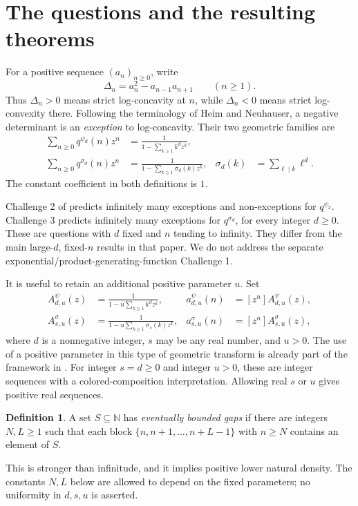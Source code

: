 \documentclass[11pt,letterpaper]{article}
\theoremstyle{definition}
\newtheorem{definition}[theorem]{Definition}
\newcommand{\N}{\mathbb N}
\newcommand{\Delt}{\Delta}
\newcommand{\sig}{\sigma}
\numberwithin{equation}{section}
\begin{document}
\clearpage
\tableofcontents
\clearpage

\section{The questions and the resulting theorems}
\label{sec:questions}

For a positive sequence $(a_n)_{n\ge0}$, write
\begin{equation}\label{eq:delta}
\Delt_n=a_n^2-a_{n-1}a_{n+1}\qquad(n\ge1).
\end{equation}
Thus $\Delt_n>0$ means strict log-concavity at $n$, while $\Delt_n<0$
means strict log-convexity there. Following the terminology of
Heim and Neuhauser, a negative determinant is an \emph{exception} to
log-concavity. Their two geometric families are
\begin{align}
\sum_{n\ge0}q^{\psi_d}(n)z^n
 &=\frac{1}{1-\sum_{k\ge1}k^d z^k},\label{eq:original-power}\\
\sum_{n\ge0}q^{\sig_d}(n)z^n
 &=\frac{1}{1-\sum_{k\ge1}\sig_d(k)z^k},
 &\sig_d(k)&=\sum_{\ell\mid k}\ell^d.\label{eq:original-divisor}
\end{align}
The constant coefficient in both definitions is $1$.

Challenge 2 of \cite{HN23} predicts infinitely many exceptions and
non-exceptions for $q^{\psi_2}$. Challenge 3 predicts infinitely many
exceptions for $q^{\sig_d}$, for every integer $d\ge0$.
These are questions with $d$ fixed and $n$ tending to infinity. They differ
from the main large-$d$, fixed-$n$ results in that paper. We do not address
the separate exponential/product-generating-function Challenge 1.

It is useful to retain an additional positive parameter $u$. Set
\begin{align}
A^\psi_{d,u}(z)&=\frac{1}{1-u\sum_{k\ge1}k^d z^k},
 &a^\psi_{d,u}(n)&=[z^n]A^\psi_{d,u}(z),\label{eq:power-family}\\
A^\sig_{s,u}(z)&=\frac{1}{1-u\sum_{k\ge1}\sig_s(k)z^k},
 &a^\sig_{s,u}(n)&=[z^n]A^\sig_{s,u}(z),\label{eq:divisor-family}
\end{align}
where $d$ is a nonnegative integer, $s$ may be any real number, and $u>0$.
The use of a positive parameter in this type of geometric transform is
already part of the framework in \cite{HN21}. For integer $s=d\ge0$ and
integer $u>0$, these are integer sequences with a colored-composition
interpretation. Allowing real $s$ or $u$ gives positive real sequences.

\begin{definition}
A set $S\subseteq\N$ has \emph{eventually bounded gaps} if there are integers
$N,L\ge1$ such that each block $\{n,n+1,\ldots,n+L-1\}$ with $n\ge N$
contains an element of $S$.
\end{definition}
This is stronger than infinitude, and it implies positive lower natural
density. The constants $N,L$ below are allowed to depend on the fixed
parameters; no uniformity in $d,s,u$ is asserted.
\end{document}
